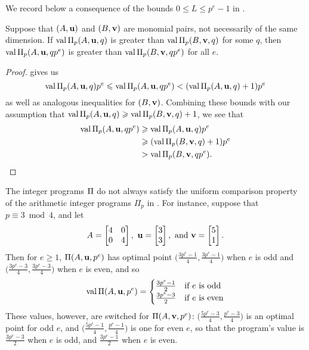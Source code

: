 \documentclass{amsart}
\begin{document}
We record below a consequence of the bounds $0 \le L \leq p^e-1$ in .

\begin{corollary}
   \label{cor: mu comparison}
   Suppose that $(A,\mathbf{u})$ and $(B,\mathbf{v})$ are monomial pairs, not necessarily of the same dimension.
   If $\operatorname{val} \Pi_p(A, \mathbf{u}, q)$ is greater than $\operatorname{val} \Pi_p(B, \mathbf{v}, q)$ for some $q$, then $\operatorname{val} \Pi_p(A, \mathbf{u}, qp^e)$ is greater than $\operatorname{val} \Pi_p(B, \mathbf{v}, qp^e)$ for all $e$.
\end{corollary}

\begin{proof}
    gives us
   \[
      \operatorname{val} \Pi_p(A, \mathbf{u},q)p^e \leqslant \operatorname{val} \Pi_p(A, \mathbf{u}, qp^e) < (\operatorname{val} \Pi_p(A, \mathbf{u}, q)+1)p^e
   \]
   as well as analogous inequalities for $(B,\mathbf{v})$.
   Combining these bounds with our assumption that $\operatorname{val} \Pi_p(A, \mathbf{u}, q) \geqslant \operatorname{val} \Pi_p(B, \mathbf{v}, q) + 1$, we see that
   \begin{align*}
     \operatorname{val} \Pi_p(A, \mathbf{u}, qp^e)  &\geqslant \operatorname{val} \Pi_p(A, \mathbf{u}, q)  p^e \\
                                  &\geqslant (\operatorname{val} \Pi_p(B, \mathbf{v}, q)+1) p^e \\
                                  & > \operatorname{val} \Pi_p(B, \mathbf{v}, qp^e). \qedhere
   \end{align*}
\end{proof}

\begin{remark}
The integer programs $\Pi$ do not always satisfy the uniform comparison property of the arithmetic integer programs $\Pi_p$ in  .
For instance, suppose that $p \equiv 3 \bmod 4$, and let
\[
 A = \begin{bmatrix} 4 & 0 \\ 0 & 4\end{bmatrix},  \
 \mathbf{u} = \begin{bmatrix}3\\ 3\end{bmatrix}, \text{ and }
 \mathbf{v} = \begin{bmatrix}5 \\ 1\end{bmatrix}.
\]
Then for $e \geq 1$, $\Pi(A, \mathbf{u}, p^e)$ has optimal point $\big( \frac{3p^e-1}{4},  \frac{3p^e-1}{4} \big)$ when $e$ is odd and $\big( \frac{3p^e-3}{4}, \frac{3p^e-3}{4}\big)$ when $e$ is even, and so 
\[
\operatorname{val}\Pi(A, \mathbf{u}, p^e) = \begin{cases}
\frac{3 p^e - 1}{2} & \text{if } e \text{ is odd} \\
\frac{3 p^e - 3}{2} & \text{if } e \text{ is even}
\end{cases}
\]
These values, however, are switched for $\Pi(A, \mathbf{v}, p^e)$: $\big( \frac{5p^e-3}{4}, \frac{p^e-3}{4} \big)$ is an optimal point for odd $e$,  and $\big( \frac{5p^e-1}{4},\frac{p^e-1}{4} \big)$ is one for even $e$, 
so that 
the program's value is $\frac{3p^e-3}{2}$ when $e$ is odd, and $\frac{3p^e-1}{2}$ when $e$ is even.
\end{remark}
\end{document}
